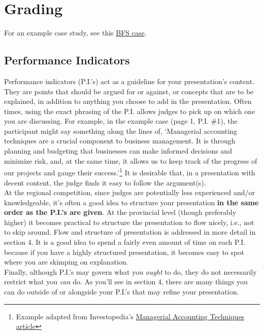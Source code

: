 \documentclass[12pt]{article}
\begin{document}
\section{Grading}

For an example case study, see this \href{https://www.deca.org/wp-content/uploads/2014/08/HS_BFS_Web_Sample.pdf}{BFS case}. 

\subsection{Performance Indicators}

	Performance indicators (P.I.'s) act as a guideline for your presentation's content. They are points that  should be argued for or against, or concepts that are to be explained, in addition to anything you choose to add in the presentation. Often times, using the exact phrasing of the P.I. allows judges to pick up on which one you are discussing. For example, in the example case (page 1, P.I. \#1), the participant might say something along the lines of, \lq  Managerial accounting techniques are a crucial component to business management. It is through planning and budgeting that businesses can make informed decisions and minimize risk, and, at the same time, it allows us to keep track of the progress of our projects and gauge their success.'\footnote{Example adapted from Investopedia's \href{http://www.investopedia.com/ask/answers/062915/what-are-common-concepts-and-techniques-managerial-accounting.asp}{Managerial Accounting Techniques article}} It is desirable that, in a presentation with decent content, the judge finds it easy to follow the argument(s). \\

	At the regional competition, since judges are potentially less experienced and/or knowledgeable, it's often a good idea to structure your presentation \textbf{in the same order as the P.I.'s are given}. At the provincial level (though preferably higher) it  becomes practical to structure the presentation to flow nicely, i.e., not to skip around. Flow and structure of presentation is addressed in more detail in section 4. It is a good idea to spend a fairly even amount of time on each P.I. because if you have a highly structured presentation, it becomes easy to spot where you are skimping on explanation. \\
	
	Finally, although P.I.'s may govern what you \textit{ought} to do, they do not necessarily restrict what you \textit{can} do. As you'll see in section 4, there are many things you can do outside of or alongside your P.I.'s that may refine your presentation.
	
\end{document}
